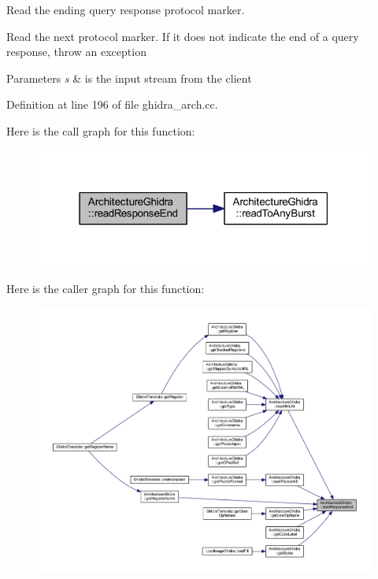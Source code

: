 Read the ending query response protocol marker. 

Read the next protocol marker. If it does not indicate the end of a query response, throw an exception 
\begin{DoxyParams}{Parameters}
{\em s} & is the input stream from the client \\
\hline
\end{DoxyParams}


Definition at line 196 of file ghidra\+\_\+arch.\+cc.

Here is the call graph for this function\+:
\nopagebreak
\begin{figure}[H]
\begin{center}
\leavevmode
\includegraphics[width=316pt]{class_architecture_ghidra_a948fffd4d8e181563ade259d97074419_cgraph}
\end{center}
\end{figure}
Here is the caller graph for this function\+:
\nopagebreak
\begin{figure}[H]
\begin{center}
\leavevmode
\includegraphics[width=350pt]{class_architecture_ghidra_a948fffd4d8e181563ade259d97074419_icgraph}
\end{center}
\end{figure}
\mbox{\label{class_architecture_ghidra_a80e284d7f210bb4f528607a5a62de7ec}} 
